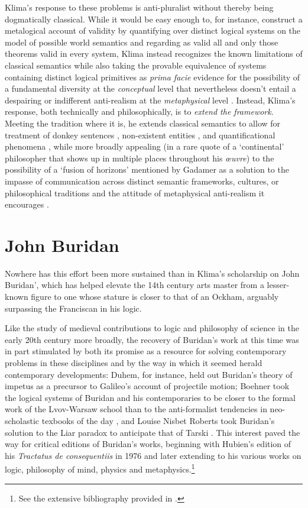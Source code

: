 \documentclass[]{article}
\begin{document}
Klima's response to these problems is anti-pluralist 
without thereby being dogmatically classical. 
While it would be easy enough to, for instance, 
construct a metalogical account of validity by quantifying over distinct logical systems on the model of possible world semantics and regarding as valid all and only those theorems valid in every system, 
Klima instead recognizes the known limitations of classical semantics 
while also taking the provable equivalence of systems containing distinct logical primitives
as \emph{prima facie} evidence for the possibility of a fundamental diversity at the \emph{conceptual} level 
that nevertheless doesn't entail a despairing or indifferent anti-realism at the \emph{metaphysical} level \autocite{Klima2012}.
Instead, 
Klima's response, 
both technically and philosophically, 
is to \emph{extend the framework}. 
Meeting the tradition where it is, he extends classical semantics to allow for treatment of 
donkey sentences \autocite{Klima1988,Klima2010}, 
non-existent entities \autocite{Klima2001}, 
and quantificational phenomena \autocite{KlimaSandu1990},
while more broadly appealing (in a rare quote of a `continental' philosopher that shows up in multiple places throughout his \emph{\oe{}uvre}) 
to the possibility of a `fusion of horizons' mentioned by Gadamer 
as a solution to the impasse of communication across distinct semantic frameworks, cultures, or philosophical traditions 
and the attitude of metaphysical anti-realism it encourages \autocite{Klima2000,Klima2009a}.

\section{John Buridan}
Nowhere has this effort been more sustained than in Klima's scholarship on John Buridan', 
which has helped elevate the 14th century arts master from a lesser-known figure to one whose stature is closer to that of an Ockham, 
arguably surpassing the Franciscan in his logic.

Like the study of medieval contributions to logic and philosophy of science in the early 20th century more broadly, 
the recovery of Buridan's work at this time was in part stimulated 
by both 
its promise as a resource for solving contemporary problems in these disciplines 
and by the way in which it seemed herald contemporary developments: 
Duhem, for instance, held out Buridan's theory of impetus as a precursor to Galileo's account of projectile motion; 
Boehner took the logical systems of Buridan and his contemporaries to be closer to the formal work of the Lvov-Warsaw school 
than to the anti-formalist tendencies in neo-scholastic texbooks of the day \autocite{Boehner1952}, 
and Louise Nisbet Roberts took Buridan's solution to the Liar paradox to anticipate that of Tarski \autocite[100]{Roberts1953}. 
This interest paved the way for critical editions of Buridan's works, beginning with Hubien's edition of his \emph{Tractatus de consequentiis} in 1976 and later extending to his various works on logic, philosophy of mind, physics and metaphysics.\footnote{See the extensive bibliography provided in \autocite{sep-buridan}.}
\end{document}
